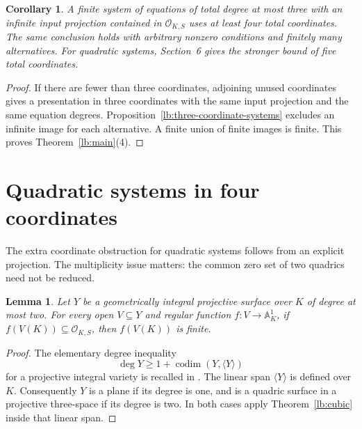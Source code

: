 \documentclass[11pt,a4paper]{article}
\newtheorem{lemma}[theorem]{Lemma}
\newtheorem{corollary}[theorem]{Corollary}
\theoremstyle{definition}
\newcommand{\OKS}{\mathcal O_{K,S}}
\newcommand{\A}{\mathbb A}
\begin{document}
\begin{corollary}\label{lb:low-degree-systems}
A finite system of equations of total degree at most three
with an infinite input projection contained in $\OKS$ uses
at least four total coordinates. The same conclusion holds
with arbitrary nonzero conditions and finitely many alternatives.
For quadratic systems, Section~6 gives the stronger bound of
five total coordinates.
\end{corollary}
\begin{proof}
If there are fewer than three coordinates, adjoining unused
coordinates gives a presentation in three coordinates with
the same input projection and the same equation degrees.
Proposition~\ref{lb:three-coordinate-systems} excludes an
infinite image for each alternative. A finite union of finite
images is finite. This proves Theorem~\ref{lb:main}(4).
\end{proof}

\section{Quadratic systems in four coordinates}

The extra coordinate obstruction for quadratic systems follows from
an explicit projection. The multiplicity issue matters: the common
zero set of two quadrics need not be reduced.

\begin{lemma}\label{lb:small-degree-surface}
Let $Y$ be a geometrically integral projective surface over $K$
of degree at most two. For every open $V\subseteq Y$ and regular
function $f:V\to\A^1_K$, if $f(V(K))\subseteq\OKS$, then
$f(V(K))$ is finite.
\end{lemma}
\begin{proof}
The elementary degree inequality
\[
 \deg Y\ge 1+\operatorname{codim}(Y,\langle Y\rangle)
\]
for a projective integral variety is recalled in
\cite[Introduction, inequality $(*)$]{EGHP}. The linear span
$\langle Y\rangle$ is defined over $K$. Consequently $Y$ is a
plane if its degree is one, and is a quadric surface in a
projective three-space if its degree is two. In both cases apply
Theorem~\ref{lb:cubic} inside that linear span.
\end{proof}
\end{document}

